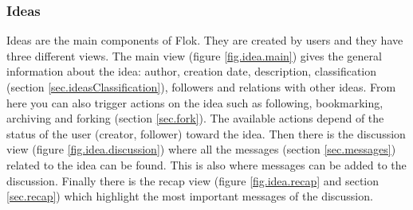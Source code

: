 \documentclass[a4paper,12pt, oneside]{article}
\begin{document}
\subsubsection{Ideas}
Ideas are the main components of Flok.
They are created by users and they have three different views.
The main view (figure \ref{fig.idea.main}) gives the general information about the idea: author, creation date, description, classification (section \ref{sec.ideasClassification}), followers and relations with other ideas.
From here you can also trigger actions on the idea such as following, bookmarking, archiving and forking (section \ref{sec.fork}).
The available actions depend of the status of the user (creator, follower) toward the idea.
Then there is the discussion view (figure \ref{fig.idea.discussion}) where all the messages (section \ref{sec.messages}) related to the idea can be found.
This is also where messages can be added to the discussion.
Finally there is the recap view (figure \ref{fig.idea.recap} and section \ref{sec.recap}) which highlight the most important messages of the discussion.
\end{document}
